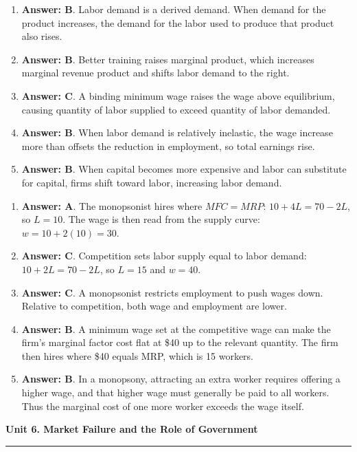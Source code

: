 \documentclass[10pt]{article}
\newcommand{\unitheader}[2]{%
  \vspace{0.35em}
  {\Large\bfseries Unit #1. #2\par}
  \vspace{0.2em}
  \hrule
  \vspace{0.55em}
}
\begin{document}
\begin{enumerate}[resume*=aps, leftmargin=*, itemsep=0.6em, topsep=0.2em, parsep=0pt]
\item \textbf{Answer: B}. Labor demand is a derived demand. When demand for the product increases, the demand for the labor used to produce that product also rises.
\item \textbf{Answer: B}. Better training raises marginal product, which increases marginal revenue product and shifts labor demand to the right.
\item \textbf{Answer: C}. A binding minimum wage raises the wage above equilibrium, causing quantity of labor supplied to exceed quantity of labor demanded.
\item \textbf{Answer: B}. When labor demand is relatively inelastic, the wage increase more than offsets the reduction in employment, so total earnings rise.
\item \textbf{Answer: B}. When capital becomes more expensive and labor can substitute for capital, firms shift toward labor, increasing labor demand.
\end{enumerate}
\begin{enumerate}[resume*=aps, leftmargin=*, itemsep=0.6em, topsep=0.2em, parsep=0pt]
\item \textbf{Answer: A}. The monopsonist hires where $MFC = MRP$: $10 + 4L = 70 - 2L$, so $L=10$. The wage is then read from the supply curve: $w = 10 + 2(10) = 30$.
\item \textbf{Answer: C}. Competition sets labor supply equal to labor demand: $10 + 2L = 70 - 2L$, so $L=15$ and $w=40$.
\item \textbf{Answer: C}. A monopsonist restricts employment to push wages down. Relative to competition, both wage and employment are lower.
\item \textbf{Answer: B}. A minimum wage set at the competitive wage can make the firm's marginal factor cost flat at \$40 up to the relevant quantity. The firm then hires where \$40 equals MRP, which is 15 workers.
\item \textbf{Answer: B}. In a monopsony, attracting an extra worker requires offering a higher wage, and that higher wage must generally be paid to all workers. Thus the marginal cost of one more worker exceeds the wage itself.
\end{enumerate}
\unitheader{6}{Market Failure and the Role of Government}
\end{document}
